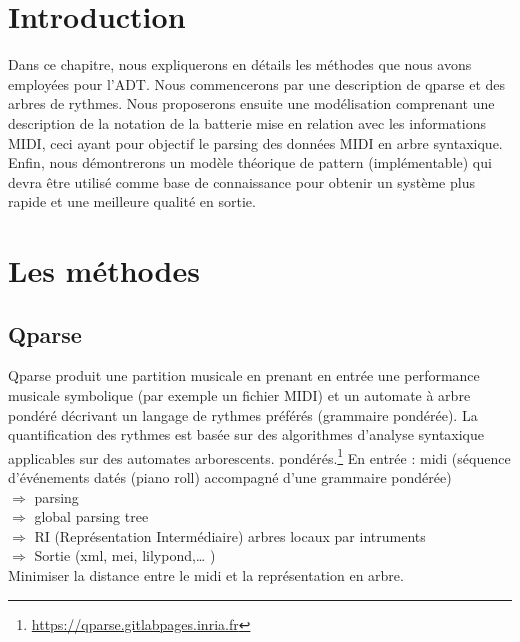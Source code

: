 \section{Introduction}
Dans ce chapitre, nous expliquerons en détails les méthodes que nous avons employées pour l’ADT. Nous commencerons par une description de qparse et des arbres de rythmes. Nous proposerons ensuite une modélisation comprenant une description de la notation de la batterie mise en relation avec les informations MIDI, ceci ayant pour objectif le parsing des données MIDI en arbre syntaxique. Enfin, nous démontrerons un modèle théorique de pattern (implémentable) qui devra être utilisé comme base de connaissance pour obtenir un système plus rapide et une meilleure qualité en sortie.
\section{Les méthodes}
\subsection{Qparse}
Qparse produit une partition musicale en prenant en entrée une performance musicale symbolique (par exemple un fichier MIDI) et un automate à arbre pondéré décrivant un langage de rythmes préférés (grammaire pondérée). La quantification des rythmes est basée sur des algorithmes d’analyse syntaxique applicables sur des automates arborescents. pondérés.\footnote{\url{https://qparse.gitlabpages.inria.fr}}
En entrée : midi (séquence d’événements datés (piano roll) accompagné d’une grammaire pondérée)\\
$\Rightarrow$ parsing\\
$\Rightarrow$ global parsing tree\\
$\Rightarrow$ RI (Représentation Intermédiaire) arbres locaux par intruments\\
$\Rightarrow$ Sortie (xml, mei, lilypond,… )\\
Minimiser la distance entre le midi et la représentation en arbre.
